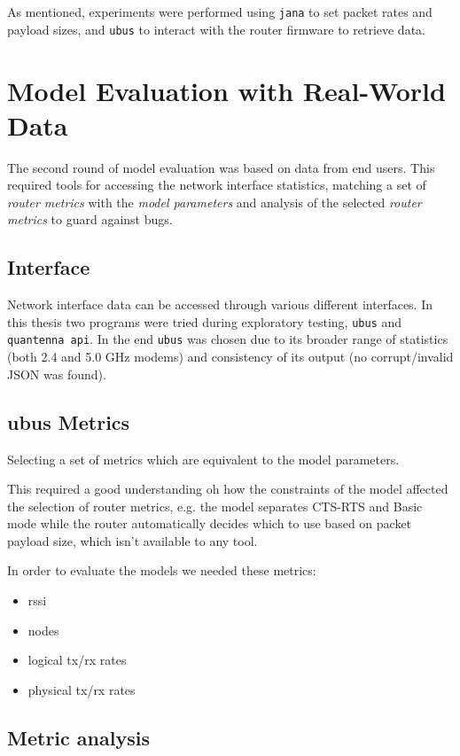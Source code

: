 As mentioned, experiments were performed using \texttt{jana} to set packet
rates and payload sizes, and \texttt{ubus} to interact with the router
firmware to retrieve data.

\section{Model Evaluation with Real-World Data}

The second round of model evaluation was based on data from end users. This
required tools for accessing the network interface statistics, matching a set of
\emph{router metrics} with the \emph{model parameters} and analysis of the
selected \emph{router metrics} to guard against bugs.

\subsection{Interface}

Network interface data can be accessed through various different interfaces. In
this thesis two programs were tried during exploratory testing, \texttt{ubus}
and \texttt{quantenna api}. In the end \texttt{ubus} was chosen due to its
broader range of statistics (both 2.4 and 5.0 GHz modems) and consistency of its
output (no corrupt/invalid JSON was found).

\subsection{ubus Metrics}
Selecting a set of metrics which are equivalent to the model parameters.

This required a good understanding oh how the constraints of the model affected
the selection of router metrics, e.g. the model separates CTS-RTS and Basic mode
while the router automatically decides which to use based on packet payload
size, which isn't available to any tool.

In order to evaluate the models we needed these metrics:

\begin{itemize}
\item rssi
\item nodes
\item logical tx/rx rates
\item physical tx/rx rates
\end{itemize}

\subsection{Metric analysis}

